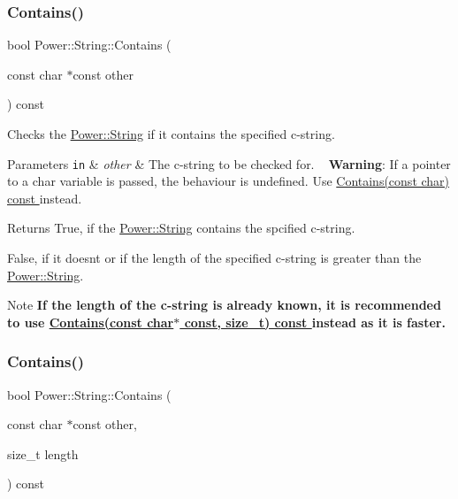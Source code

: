 \subsubsection{\texorpdfstring{Contains()}{Contains()}\hspace{0.1cm}{\footnotesize\ttfamily [2/4]}}
{\footnotesize\ttfamily bool Power\+::\+String\+::\+Contains (\begin{DoxyParamCaption}\item[{const char $\ast$const}]{other }\end{DoxyParamCaption}) const\hspace{0.3cm}{\ttfamily [inline]}}



Checks the \hyperlink{class_power_1_1_string}{Power\+::\+String} if it contains the specified c-\/string. 


\begin{DoxyParams}[1]{Parameters}
\mbox{\tt in}  & {\em other} & The c-\/string to be checked for. ~\newline
 {\bfseries Warning}\+: If a pointer to a char variable is passed, the behaviour is undefined. Use \hyperlink{class_power_1_1_string_a728af5dfae32933d8548a657d7cd2043}{Contains(const char) const }instead. \\
\hline
\end{DoxyParams}
\begin{DoxyReturn}{Returns}
True, if the \hyperlink{class_power_1_1_string}{Power\+::\+String} contains the spcified c-\/string. 

False, if it doesn\textquotesingle{}t or if the length of the specified c-\/string is greater than the \hyperlink{class_power_1_1_string}{Power\+::\+String}. 
\end{DoxyReturn}
\begin{DoxyNote}{Note}
{\bfseries If the length of the c-\/string is already known, it is recommended to use \hyperlink{class_power_1_1_string_a7ed6567e4c08c0b61f415039a665d3ff}{Contains(const char$\ast$ const, size\+\_\+t) const }instead as it is faster.} 
\end{DoxyNote}
\mbox{\label{class_power_1_1_string_a7ed6567e4c08c0b61f415039a665d3ff}} 
\subsubsection{\texorpdfstring{Contains()}{Contains()}\hspace{0.1cm}{\footnotesize\ttfamily [3/4]}}
{\footnotesize\ttfamily bool Power\+::\+String\+::\+Contains (\begin{DoxyParamCaption}\item[{const char $\ast$const}]{other,  }\item[{size\+\_\+t}]{length }\end{DoxyParamCaption}) const\hspace{0.3cm}{\ttfamily [inline]}}




